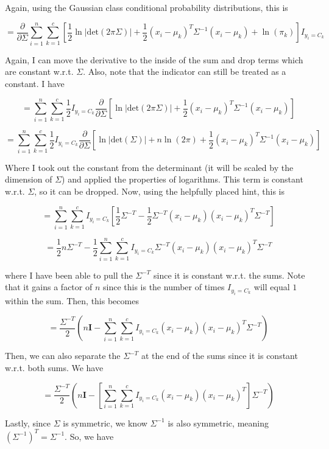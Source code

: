 \documentclass[submit]{harvardml}
\begin{document}
\begin{enumerate}
    Again, using the Gaussian class conditional probability distributions, this is
    
    $$ = \frac{\partial}{\partial \Sigma}\sum_{i=1}^n \sum_{k=1}^c [ \frac{1}{2}\ln|\textrm{det}(2\pi \Sigma)| + \frac{1}{2}(x_i-\mu_k)^T\Sigma^{-1}(x_i-\mu_k) +\ln(\pi_k)] I_{y_i=C_k} $$
    
    Again, I can move the derivative to the inside of the sum and drop terms which are constant w.r.t. $\Sigma$. Also, note that the indicator can still be treated as a constant. I have
    
    $$ = \sum_{i=1}^n \sum_{k=1}^c \frac{1}{2}I_{y_i=C_k} \frac{\partial}{\partial \Sigma}[ \ln|\textrm{det}(2\pi \Sigma)| + \frac{1}{2}(x_i-\mu_k)^T\Sigma^{-1}(x_i-\mu_k)]  $$
    
    $$ = \sum_{i=1}^n \sum_{k=1}^c \frac{1}{2}I_{y_i=C_k} \frac{\partial}{\partial \Sigma}[ \ln|\textrm{det}( \Sigma)| +n\ln(2\pi) + \frac{1}{2}(x_i-\mu_k)^T\Sigma^{-1}(x_i-\mu_k)]  $$
    
    Where I took out the constant from the determinant (it will be scaled by the dimension of $\Sigma$) and applied the properties of logarithms. This term is constant w.r.t. $\Sigma$, so it can be dropped. Now, using the helpfully placed hint, this is
    
    $$ = \sum_{i=1}^n \sum_{k=1}^c I_{y_i=C_k} [ \frac{1}{2}\Sigma^{-T} - \frac{1}{2}\Sigma^{-T}(x_i-\mu_k)(x_i-\mu_k)^T\Sigma^{-T}]  $$
    
    $$ =  \frac{1}{2} n\Sigma^{-T}-\frac{1}{2}\sum_{i=1}^n \sum_{k=1}^c I_{y_i=C_k}  \Sigma^{-T}(x_i-\mu_k)(x_i-\mu_k)^T\Sigma^{-T}  $$
    
    where I have been able to pull the $\Sigma^{-T}$ since it is constant w.r.t. the sums. Note that it gains a factor of $n$ since this is the number of times $I_{y_i=C_k} $ will equal $1$ within the sum. Then, this becomes
    
    $$  = \frac{\Sigma^{-T}}{2}(n\mathbf{I}- \sum_{i=1}^n\sum_{k=1}^c I_{y_i=C_k} (x_i-\mu_k)(x_i-\mu_k)^T\Sigma^{-T})  $$
    
    Then, we can also separate the $\Sigma^{-T}$ at the end of the sums since it is constant w.r.t. both sums. We have
    
    $$  = \frac{\Sigma^{-T}}{2}(n\mathbf{I}- [\sum_{i=1}^n\sum_{k=1}^c I_{y_i=C_k} (x_i-\mu_k)(x_i-\mu_k)^T]\Sigma^{-T})  $$
    
    Lastly, since $\Sigma$ is symmetric, we know $\Sigma^{-1}$ is also symmetric, meaning $(\Sigma^{-1})^T = \Sigma^{-1}$. So, we have
    

\end{enumerate}
\end{document}

